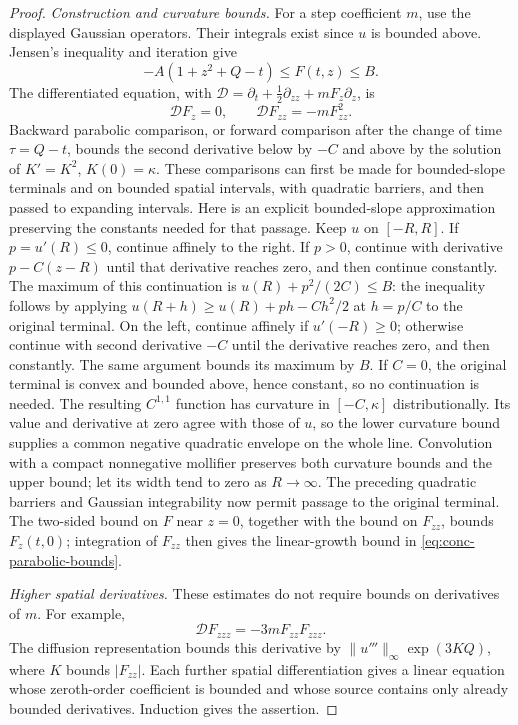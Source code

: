 \documentclass[11pt,a4paper]{article}
\numberwithin{equation}{section}
\theoremstyle{definition}
\theoremstyle{remark}
\begin{document}
\begin{proof}
\emph{Construction and curvature bounds.}
For a step coefficient $m$, use the displayed Gaussian operators.  Their
integrals exist since $u$ is bounded above.  Jensen's inequality and iteration
give
\[
 -A(1+z^2+Q-t)\leq F(t,z)\leq B.
\]
The differentiated equation, with
$\mathcal D=\partial_t+\frac12\partial_{zz}+mF_z\partial_z$, is
\[
 \mathcal D F_z=0,\qquad
 \mathcal D F_{zz}=-m F_{zz}^2.
\]
Backward parabolic comparison, or forward comparison after the change of
time $\tau=Q-t$, bounds the second derivative below by $-C$ and above by
the solution of $K'=K^2$, $K(0)=\kappa$.  These comparisons can first be made
for bounded-slope terminals and on bounded spatial intervals, with quadratic
barriers, and then passed to expanding intervals.  Here is an explicit
bounded-slope approximation preserving the constants needed for that passage.
Keep $u$ on $[-R,R]$.  If $p=u'(R)\leq0$, continue affinely to the right.
If $p>0$, continue with derivative $p-C(z-R)$ until that derivative reaches
zero, and then continue constantly.  The maximum of this continuation is
$u(R)+p^2/(2C)\leq B$: the inequality follows by applying
$u(R+h)\geq u(R)+ph-Ch^2/2$ at $h=p/C$ to the original terminal.
On the left, continue affinely if $u'(-R)\geq0$; otherwise continue with
second derivative $-C$ until the derivative reaches zero, and then
constantly.  The same argument bounds its maximum by $B$.
If $C=0$, the original terminal is convex and bounded above, hence constant,
so no continuation is needed.  The resulting $C^{1,1}$ function has
curvature in $[-C,\kappa]$ distributionally.  Its value and derivative at
zero agree with those of $u$, so the lower curvature bound supplies a common
negative quadratic envelope on the whole line.  Convolution with a compact
nonnegative mollifier preserves both curvature bounds and the upper bound;
let its width tend to zero as $R\to\infty$.
The preceding quadratic barriers and Gaussian integrability now permit
passage to the original terminal.  The two-sided bound on $F$ near
$z=0$, together with the bound on $F_{zz}$, bounds $F_z(t,0)$; integration of
$F_{zz}$ then gives the linear-growth bound in
\eqref{eq:conc-parabolic-bounds}.

\emph{Higher spatial derivatives.}
These estimates do not require bounds on derivatives of $m$.  For example,
\[
 \mathcal D F_{zzz}=-3mF_{zz}F_{zzz}.
\]
The diffusion representation bounds this derivative by
$\|u'''\|_\infty\exp(3KQ)$, where $K$ bounds $|F_{zz}|$.
Each further spatial differentiation gives a linear equation whose
zeroth-order coefficient is bounded and whose source contains only already
bounded derivatives.  Induction gives the assertion.


\end{proof}
\end{document}
